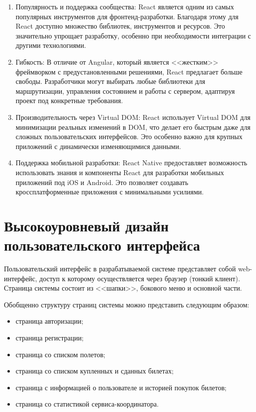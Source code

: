 \begin{enumerate}
	\item Популярность и поддержка сообщества: React является одним из самых популярных инструментов для фронтенд-разработки. Благодаря этому для React доступно множество библиотек, инструментов и ресурсов. Это значительно упрощает разработку, особенно при необходимости интеграции с другими технологиями.
	\item Гибкость: В отличие от Angular, который является <<жестким>> фреймворком с предустановленными решениями, React предлагает больше свободы. Разработчики могут выбирать любые библиотеки для маршрутизации, управления состоянием и работы с сервером, адаптируя проект под конкретные требования.
	\item Производительность через Virtual DOM: React использует Virtual DOM для минимизации реальных изменений в DOM, что делает его быстрым даже для сложных пользовательских интерфейсов. Это особенно важно для крупных приложений с динамически изменяющимися данными.
	\item Поддержка мобильной разработки: React Native предоставляет возможность использовать знания и компоненты React для разработки мобильных приложений под iOS и Android. Это позволяет создавать кроссплатформенные приложения с минимальными усилиями.
\end{enumerate}


\section{Высокоуровневый дизайн пользовательского интерфейса}

Пользовательский интерфейс в разрабатываемой системе представляет собой web-интерфейс, доступ к которому осуществляется через браузер (тонкий клиент). Страница системы состоит из <<шапки>>, бокового меню и основной части.

Обобщенно структуру страниц системы можно представить следующим образом:
\begin{itemize}
  \item страница авторизации;
	\item страница регистрации;
	\item страница со списком полетов;
	\item страница со списком купленных и сданных билетах;
	\item страница с информацией о пользователе и историей покупок билетов;
	\item страница со статистикой сервиса-координатора.
\end{itemize}

